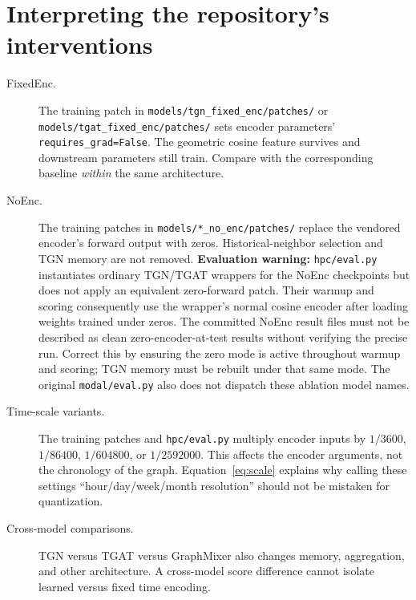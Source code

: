 \documentclass[11pt]{article}
\begin{document}
\section{Interpreting the repository's interventions}
\begin{description}
\item[FixedEnc.] The training patch in \texttt{models/tgn\_fixed\_enc/patches/} or \texttt{models/tgat\_fixed\_enc/patches/} sets encoder parameters' \texttt{requires\_grad=False}. The geometric cosine feature survives and downstream parameters still train. Compare with the corresponding baseline \emph{within} the same architecture.
\item[NoEnc.] The training patches in \texttt{models/*\_no\_enc/patches/} replace the vendored encoder's forward output with zeros. Historical-neighbor selection and TGN memory are not removed. \textbf{Evaluation warning:} \texttt{hpc/eval.py} instantiates ordinary TGN/TGAT wrappers for the NoEnc checkpoints but does not apply an equivalent zero-forward patch. Their warmup and scoring consequently use the wrapper's normal cosine encoder after loading weights trained under zeros. The committed NoEnc result files must not be described as clean zero-encoder-at-test results without verifying the precise run. Correct this by ensuring the zero mode is active throughout warmup and scoring; TGN memory must be rebuilt under that same mode. The original \texttt{modal/eval.py} also does not dispatch these ablation model names.
\item[Time-scale variants.] The training patches and \texttt{hpc/eval.py} multiply encoder inputs by $1/3600$, $1/86400$, $1/604800$, or $1/2592000$. This affects the encoder arguments, not the chronology of the graph. Equation~\eqref{eq:scale} explains why calling these settings ``hour/day/week/month resolution'' should not be mistaken for quantization.
\item[Cross-model comparisons.] TGN versus TGAT versus GraphMixer also changes memory, aggregation, and other architecture. A cross-model score difference cannot isolate learned versus fixed time encoding.
\end{description}
\end{document}

